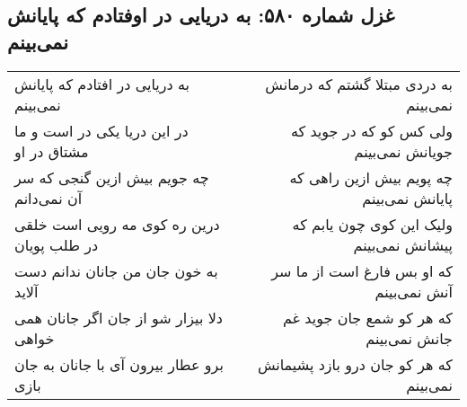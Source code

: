 \begin{center}
\section*{غزل شماره ۵۸۰: به دریایی در اوفتادم که پایانش نمی‌بینم}
\label{sec:580}
\begin{longtable}{l p{0.5cm} r}
به دریایی در افتادم که پایانش نمی‌بینم
&&
به دردی مبتلا گشتم که درمانش نمی‌بینم
\\
در این دریا یکی در است و ما مشتاق در او
&&
ولی کس کو که در جوید که جویانش نمی‌بینم
\\
چه جویم بیش ازین گنجی که سر آن نمی‌دانم
&&
چه پویم بیش ازین راهی که پایانش نمی‌بینم
\\
درین ره کوی مه رویی است خلقی در طلب پویان
&&
ولیک این کوی چون یابم که پیشانش نمی‌بینم
\\
به خون جان من جانان ندانم دست آلاید
&&
که او بس فارغ است از ما سر آنش نمی‌بینم
\\
دلا بیزار شو از جان اگر جانان همی خواهی
&&
که هر کو شمع جان جوید غم جانش نمی‌بینم
\\
برو عطار بیرون آی با جانان به جان بازی
&&
که هر کو جان درو بازد پشیمانش نمی‌بینم
\\
\end{longtable}
\end{center}
